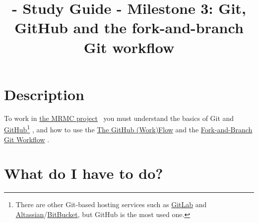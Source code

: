 
\title{\SM{} - Study Guide - Milestone 3: Git, GitHub and the fork-and-branch Git workflow}

\maketitle

\tableofcontents

\lstset{
  showstringspaces=false,
  upquote=true
}

\section{Description}

To work in
\href{https://github.com/Sistemas-Multimedia/MRVC}{the MRMC
  project}~\cite{MRVC} you must understand the basics of
Git \cite{Git-book} and
\href{https://github.com/}{GitHub}\footnote{There are other Git-based
hosting services such as \href{https://about.gitlab.com/}{GitLab} and
\href{https://www.atlassian.com/git}{Altassian}/\href{https://bitbucket.org/product}{BitBucket},
but GitHub is the most used one.} \cite{GitHub}, and how to use the
\href{https://guides.github.com/introduction/flow/index.html}{The
  GitHub (Work)Flow} and the
\href{https://github.com/vicente-gonzalez-ruiz/fork_and_branch_git_workflow}{Fork-and-Branch
  Git Workflow} \cite{fork-and-branch-git-workflow}.

\section{What do I have to do?}

